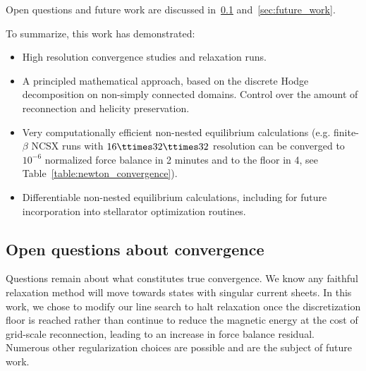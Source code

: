 \documentclass[%
 reprint,
 superscriptaddress,
 amsmath,amssymb,
 aps, nofootinbib, floatfix]{revtex4-2}
\begin{document}
Open questions and future work are discussed in~\ref{sec:convergence_discussion} and~\ref{sec:future_work}.

To summarize, this work has demonstrated:
\begin{itemize}
    \item High resolution convergence studies and relaxation runs. 
    \item A principled mathematical approach, based on the discrete Hodge decomposition on non-simply connected domains. Control over the amount of reconnection and helicity preservation.
    \item Very computationally efficient non-nested equilibrium calculations (e.g. finite-$\beta$ NCSX runs with $16\ttimes 32 \ttimes 32$ resolution can be converged to $10^{-6}$ normalized force balance in 2 minutes and to the floor in 4, see Table~\ref{table:newton_convergence}).
    \item Differentiable non-nested equilibrium calculations, including for future incorporation into stellarator optimization routines.
\end{itemize}

\subsection{Open questions about convergence}
\label{sec:convergence_discussion}

Questions remain about what constitutes true convergence. We know any faithful relaxation method will move towards states with singular current sheets. In this work, we chose to modify our line search to halt relaxation once the discretization floor is reached rather than continue to reduce the magnetic energy at the cost of grid-scale reconnection, leading to an increase in force balance residual.
%
Numerous other regularization choices are possible and are the subject of future work.
\end{document}
